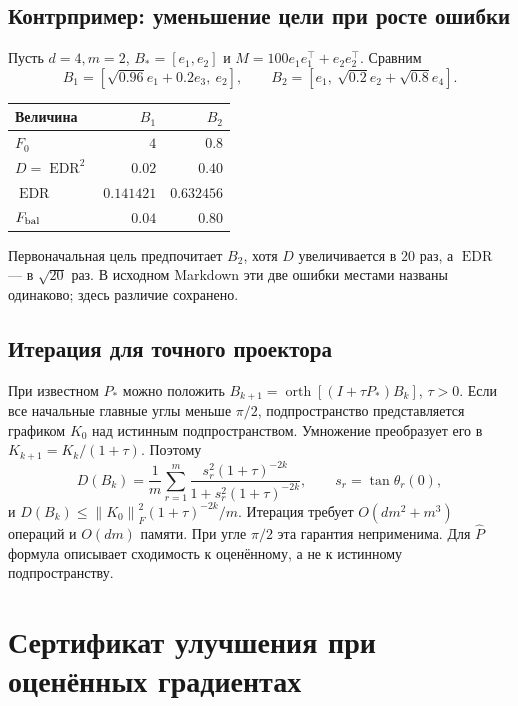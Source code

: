 \documentclass[11pt,a4paper]{article}
\newcommand{\norm}[1]{\left\lVert#1\right\rVert}
\newcommand{\EDR}{\operatorname{EDR}}
\begin{document}
\subsection{Контрпример: уменьшение цели при росте ошибки}
Пусть $d=4,m=2$, $B_*=[e_1,e_2]$ и
$M=100e_1e_1^\top+e_2e_2^\top$. Сравним
\[
 B_1=[\sqrt{0.96}e_1+0.2e_3,\ e_2],\qquad
 B_2=[e_1,\ \sqrt{0.2}e_2+\sqrt{0.8}e_4].
\]
\begin{center}
\begin{tabular}{@{}lrr@{}}
\toprule
Величина & $B_1$ & $B_2$ \\
\midrule
$F_0$ & $4$ & $0.8$ \\
$D=\EDR^2$ & $0.02$ & $0.40$ \\
$\EDR$ & $0.141421$ & $0.632456$ \\
$F_{\rm bal}$ & $0.04$ & $0.80$ \\
\bottomrule
\end{tabular}
\end{center}
Первоначальная цель предпочитает $B_2$, хотя $D$ увеличивается в $20$
раз, а $\EDR$ --- в $\sqrt{20}$ раз. В исходном Markdown эти две
ошибки местами названы одинаково; здесь различие сохранено.

\subsection{Итерация для точного проектора}
При известном $P_*$ можно положить
$B_{k+1}=\operatorname{orth}[(I+\tau P_*)B_k]$, $\tau>0$.
Если все начальные главные углы меньше $\pi/2$, подпространство
представляется графиком $K_0$ над истинным подпространством.
Умножение преобразует его в $K_{k+1}=K_k/(1+\tau)$. Поэтому
\begin{equation}\label{eq:iteration}
 D(B_k)=\frac1m\sum_{r=1}^m
 \frac{s_r^2(1+\tau)^{-2k}}{1+s_r^2(1+\tau)^{-2k}},\qquad
 s_r=\tan\theta_r(0),
\end{equation}
и $D(B_k)\le\norm{K_0}_F^2(1+\tau)^{-2k}/m$.
Итерация требует $O(dm^2+m^3)$ операций и $O(dm)$ памяти.
При угле $\pi/2$ эта гарантия неприменима. Для $\widehat P$ формула
описывает сходимость к оценённому, а не к истинному подпространству.

\section{Сертификат улучшения при оценённых градиентах}
\end{document}
